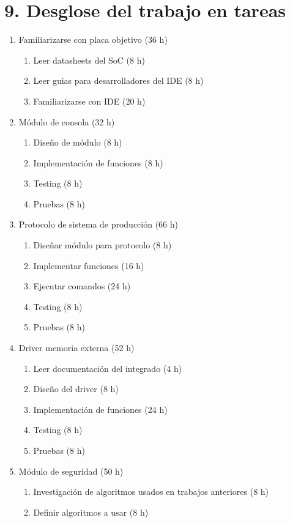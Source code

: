 \documentclass[
11pt, %
]{charter}
\begin{document}
\section{9. Desglose del trabajo en tareas}
\label{sec:wbs}

\begin{enumerate}
\item Familiarizarse con placa objetivo (36 h)
	\begin{enumerate}
	\item Leer datasheets del SoC (8 h)
	\item Leer guias para desarrolladores del IDE (8 h)
	\item Familiarizarse con IDE (20 h)
	\end{enumerate}
\item Módulo de consola (32 h)
	\begin{enumerate}
	\item Diseño de módulo (8 h)
	\item Implementación de funciones (8 h)
	\item Testing (8 h)
	\item Pruebas (8 h)
	\end{enumerate}
\item Protocolo de sistema de producción (66 h)
	\begin{enumerate}
	\item Diseñar módulo para protocolo (8 h)
	\item Implementar funciones (16 h)
	\item Ejecutar comandos (24 h)
	\item Testing (8 h)
	\item Pruebas (8 h)
	\end{enumerate}
\item Driver memoria externa (52 h)
	\begin{enumerate}
	\item Leer documentación del integrado (4 h)
	\item Diseño del driver	(8 h)
	\item Implementación de funciones (24 h)
	\item Testing (8 h)
	\item Pruebas (8 h)
	\end{enumerate}
\item Módulo de seguridad (50 h)
	\begin{enumerate}
	\item Investigación de algoritmos usados en trabajos anteriores (8 h)
	\item Definir algoritmos a usar (8 h)

\end{enumerate}
\end{enumerate}
\end{document}

